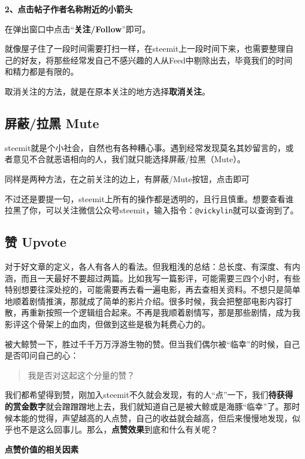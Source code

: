 \documentclass[]{ctexbook}
\begin{document}
\textbf{2、点击帖子作者名称附近的小箭头}

在弹出窗口中点击``\textbf{关注/Follow}''即可。

就像屋子住了一段时间需要打扫一样，在steemit上一段时间下来，也需要整理自己的好友，将那些经常发自己不感兴趣的人从Feed中剔除出去，毕竟我们的时间和精力都是有限的。

取消关注的方法，就是在原本关注的地方选择\textbf{取消关注}。

\hypertarget{-mute}{%
\subsection{屏蔽/拉黑 Mute}\label{-mute}}

steemit就是个小社会，自然也有各种糟心事。遇到经常发现莫名其妙留言的，或者意见不合就恶语相向的人，我们就只能选择屏蔽/拉黑（Mute）。

同样是两种方法，在之前关注的边上，有屏蔽/Mute按钮，点击即可

不过还是要提一句，steemit上所有的操作都是透明的，且行且慎重。想要查看谁拉黑了你，可以关注微信公众号steemit，输入指令：\texttt{@vickylin}就可以查询到了。

\hypertarget{-upvote}{%
\subsection{赞 Upvote}\label{-upvote}}

对于好文章的定义，各人有各人的看法。但我粗浅的总结：总长度、有深度、有内涵，而且一天最好不要超过两篇。比如我写一篇影评，可能需要三四个小时，有些特别想要往深处挖的，可能需要再去看一遍电影，再去查相关资料。不想只是简单地顺着剧情推演，那就成了简单的影片介绍。很多时候，我会把整部电影内容打散，再重新按照一个逻辑组合起来。不再是我顺着剧情写，那是那些剧情，成为我影评这个骨架上的血肉，但做到这些是极为耗费心力的。

被大鲸赞一下，胜过千千万万浮游生物的赞。但当我们偶尔被``临幸''的时候，自己是否叩问自己的心：

\begin{quote}
我是否对这起这个分量的赞？
\end{quote}

我们都希望得到赞，刚加入steemit不久就会发现，有的人``点''一下，我们\textbf{待获得的赏金数字}就会蹭蹭蹭地上去，我们就知道自己是被大鲸或是海豚``临幸''了。那时候本能的觉得，声望越高的人点赞，自己的收益就会越高，但后来慢慢地发现，似乎也不是这么回事儿。那么，\textbf{点赞效果}到底和什么有关呢？

\textbf{点赞价值的相关因素}
\end{document}
